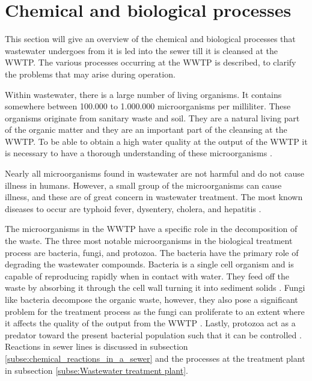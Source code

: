 \section{Chemical and biological processes}\label{se:chemical_process}
This section will give an overview of the chemical and biological processes that wastewater undergoes from it is led into the sewer till it is cleansed at the WWTP. The various processes occurring at the WWTP is described, to clarify the problems that may arise during operation. 

Within wastewater, there is a large number of living organisms. It contains somewhere between 100.000 to 1.000.000 microorganisms per milliliter. These organisms originate from sanitary waste and soil. They are a natural living part of the organic matter and they are an important part of the cleansing at the WWTP. To be able to obtain a high water quality at the output of the WWTP it is necessary to have a thorough understanding of these microorganisms \cite{biological_wastewater}. %

Nearly all microorganisms found in wastewater are not harmful and do not cause illness in humans. However, a small group of the microorganisms can cause illness, and these are of great concern in wastewater treatment. The most known diseases to occur are typhoid fever, dysentery, cholera, and hepatitis \cite{biological_wastewater}.

The microorganisms in the WWTP have a specific role in the decomposition of the waste. The three most notable microorganisms in the biological treatment process are bacteria, fungi, and protozoa. The bacteria have the primary role of degrading the wastewater compounds.  Bacteria is a single cell organism and is capable of reproducing rapidly when in contact with water. They feed off the waste by absorbing it through the cell wall turning it into sediment solids \cite{biological_wastewater}. 
Fungi like bacteria decompose the organic waste, however, they also pose a significant problem for the treatment process as the fungi can proliferate to an extent where it affects the quality of the output from the WWTP \cite{fungi_source}. 
Lastly, protozoa act as a predator toward the present bacterial population such that it can be controlled \cite{biological_wastewater}. Reactions in sewer lines is discussed in subsection \ref{subse:chemical_reactions_in_a_sewer} and the processes at the treatment plant in subsection \ref{subse:Wastewater treatment plant}.

